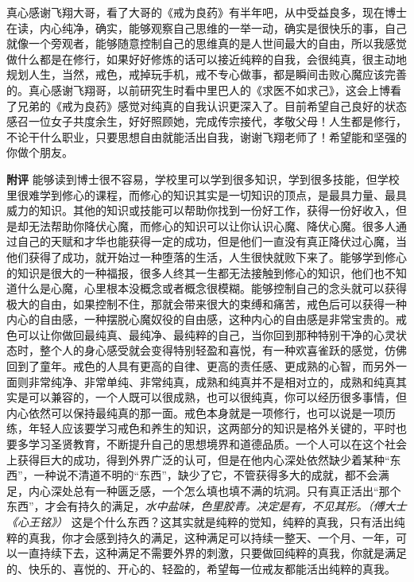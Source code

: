 \begin{case}
    真心感谢飞翔大哥，看了大哥的《戒为良药》有半年吧，从中受益良多，现在博士在读，内心纯净，确实，能够观察自己思维的一举一动，确实是很快乐的事，自己就像一个旁观者，能够随意控制自己的思维真的是人世间最大的自由，所以我感觉做什么都是在修行，如果好好修炼的话可以接近纯粹的自我，会很纯真，很主动地规划人生，当然，戒色，戒掉玩手机，戒不专心做事，都是瞬间击败心魔应该完善的。真心感谢飞翔哥，以前研究生时看中里巴人的《求医不如求己》，这会上博看了兄弟的《戒为良药》感觉对纯真的自我认识更深入了。目前希望自己良好的状态感召一位女子共度余生，好好照顾她，完成传宗接代，孝敬父母！人生都是修行，不论干什么职业，只要思想自由就能活出自我，谢谢飞翔老师了！希望能和坚强的你做个朋友。

    \textbf{附评} 能够读到博士很不容易，学校里可以学到很多知识，学到很多技能，但学校里很难学到修心的课程，而修心的知识其实是一切知识的顶点，是最具力量、最具威力的知识。其他的知识或技能可以帮助你找到一份好工作，获得一份好收入，但是却无法帮助你降伏心魔，而修心的知识可以让你认识心魔、降伏心魔。很多人通过自己的天赋和才华也能获得一定的成功，但是他们一直没有真正降伏过心魔，当他们获得了成功，就开始过一种堕落的生活，人生很快就败下来了。能够学到修心的知识是很大的一种福报，很多人终其一生都无法接触到修心的知识，他们也不知道什么是心魔，心里根本没概念或者概念很模糊。能够控制自己的念头就可以获得极大的自由，如果控制不住，那就会带来很大的束缚和痛苦，戒色后可以获得一种内心的自由感，一种摆脱心魔奴役的自由感，这种内心的自由感是非常宝贵的。戒色可以让你做回最纯真、最纯净、最纯粹的自己，当你回到那种特别干净的心灵状态时，整个人的身心感受就会变得特别轻盈和喜悦，有一种欢喜雀跃的感觉，仿佛回到了童年。戒色的人具有更高的自律、更高的责任感、更成熟的心智，而另外一面则非常纯净、非常单纯、非常纯真，成熟和纯真并不是相对立的，成熟和纯真其实是可以兼容的，一个人既可以很成熟，也可以很纯真，你可以经历很多事情，但内心依然可以保持最纯真的那一面。戒色本身就是一项修行，也可以说是一项历练，年轻人应该要学习戒色和养生的知识，这两部分的知识是格外关键的，平时也要多学习圣贤教育，不断提升自己的思想境界和道德品质。一个人可以在这个社会上获得巨大的成功，得到外界广泛的认可，但是在他内心深处依然缺少着某种“东西”，一种说不清道不明的“东西”，缺少了它，不管获得多大的成就，都不会满足，内心深处总有一种匮乏感，一个怎么填也填不满的坑洞。只有真正活出“那个东西”，才会有持久的满足，\textit{水中盐味，色里胶青。决定是有，不见其形。（傅大士《心王铭》）} 这是个什么东西？这其实就是纯粹的觉知，纯粹的真我，只有活出纯粹的真我，你才会感到持久的满足，这种满足可以持续一整天、一个月、一年，可以一直持续下去，这种满足不需要外界的刺激，只要做回纯粹的真我，你就是满足的、快乐的、喜悦的、开心的、轻盈的，希望每一位戒友都能活出纯粹的真我。
\end{case}

